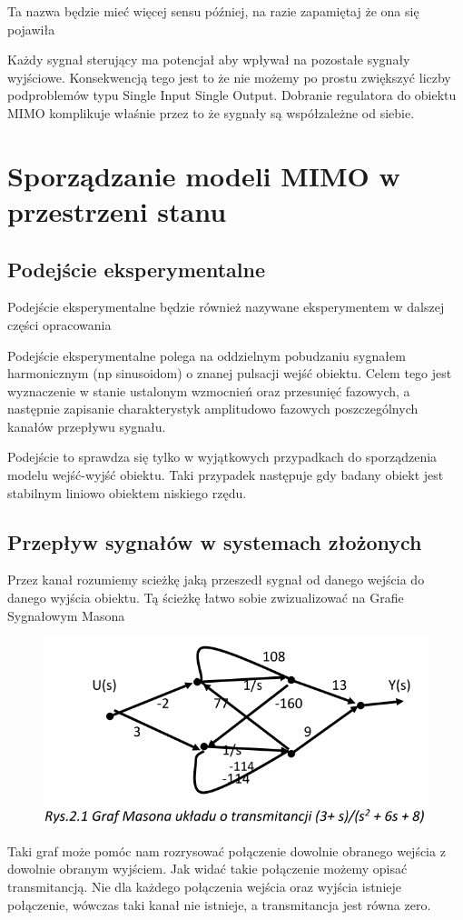 \documentclass{article}
\begin{document}
	Ta nazwa będzie mieć więcej sensu później, na razie zapamiętaj że ona się pojawiła

	Każdy sygnał sterujący ma potencjał aby wpływał na pozostałe sygnały wyjściowe.
	Konsekwencją tego jest to że nie możemy po prostu zwiększyć liczby podproblemów
	typu Single Input Single Output. Dobranie regulatora do obiektu MIMO komplikuje
	właśnie przez to że sygnały są współzależne od siebie.

	\section{Sporządzanie modeli MIMO w przestrzeni stanu}

	\subsection{Podejście eksperymentalne}

		Podejście eksperymentalne będzie również nazywane eksperymentem w dalszej
		części opracowania

		Podejście eksperymentalne polega na oddzielnym pobudzaniu sygnałem harmonicznym
		(np sinusoidom) o znanej pulsacji wejść obiektu. Celem tego jest wyznaczenie w
		stanie ustalonym wzmocnień oraz przesunięć fazowych, a następnie zapisanie
		charakterystyk amplitudowo fazowych poszczególnych kanałów przepływu sygnału.

		Podejście to sprawdza się tylko w wyjątkowych przypadkach
		do sporządzenia modelu wejść-wyjść obiektu.
		Taki przypadek następuje gdy badany obiekt jest stabilnym liniowo
		obiektem niskiego rzędu.

	\subsection{Przepływ sygnałów w systemach złożonych}

		Przez kanał rozumiemy scieżkę jaką przeszedł sygnał od danego wejścia
		do danego wyjścia obiektu. Tą ścieżkę łatwo sobie zwizualizować na
		Grafie Sygnałowym Masona
		\begin{figure}
			\includegraphics[height=0.5\textwidth]{GrafMasona.png}
		\end{figure}
		Taki graf może pomóc nam rozrysować połączenie dowolnie obranego wejścia z
		dowolnie obranym wyjściem. Jak widać takie połączenie możemy opisać transmitancją.
		Nie dla każdego połączenia wejścia oraz wyjścia istnieje połączenie, wówczas taki
		kanał nie istnieje, a transmitancja jest równa zero.
\end{document}
